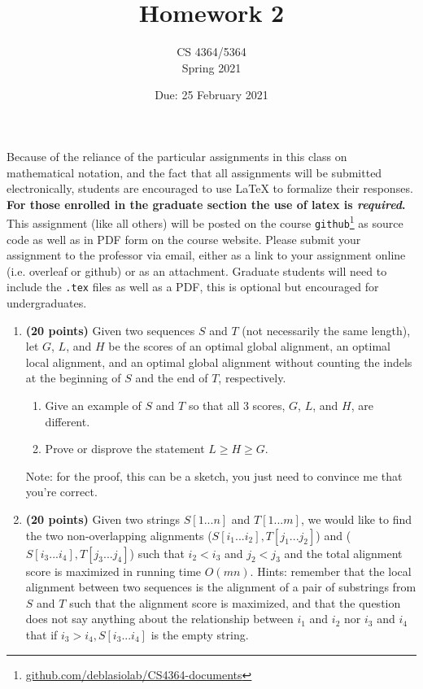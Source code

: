 \documentclass[11pt, oneside]{article}   	%
\title{Homework 2}
\author{CS 4364/5364\\Spring 2021}
\date{Due: 25 February 2021}							%
\begin{document}
\maketitle

Because of the reliance of the particular assignments in this class on mathematical notation, 
and the fact that all assignments will be submitted electronically, 
students are encouraged to use \LaTeX{} to formalize their responses. 
\textbf{For those enrolled in the graduate section the use of latex is \emph{required}.}
This assignment (like all others) will be posted on the course \texttt{github}\footnote{\url{github.com/deblasiolab/CS4364-documents}} as source code as well as in PDF form on the course website. 
Please submit your assignment to the professor via email, either as a link to your assignment online (i.e. overleaf or github) or as an attachment. 
Graduate students will need to include the \texttt{.tex} files as well as a PDF, this is optional but encouraged for undergraduates. 


\begin{enumerate}


\item \textbf{(20 points)} 
Given two sequences $S$ and $T$ (not necessarily the same length), 
let $G$, $L$, and $H$ be the scores of an optimal global alignment, an optimal local alignment, 
and an optimal global alignment without counting the indels at the beginning of $S$ and the end of $T$, respectively. 
\begin{enumerate}
\item Give an example of $S$ and $T$ so that all 3 scores, $G$, $L$, and $H$, are different. 
\item Prove or disprove the statement $L \ge H \ge G$.
\end{enumerate}

Note: for the proof, this can be a sketch, you just need to convince me that you're correct. 


\item \textbf{(20 points)} 
Given two strings $S[1...n]$ and $T[1...m]$, we would like to find the two non-overlapping alignments 
($S[i_1...i_2],T[j_1...j_2]$) and ($S[i_3...i_4],T[j_3...j_4]$) such that $i_2<i_3$ and $j_2<j_3$ and the total alignment score is maximized 
in running time $O(mn)$. 
Hints: remember that the local alignment between two sequences is the alignment of a pair of substrings from $S$ and $T$ such that the alignment score is maximized, 
and that the question does not say anything about the relationship between $i_1$ and $i_2$ nor $i_3$ and $i_4$ that if $i_3>i_4, S[i_3...i_4]$ is the empty string.
\end{enumerate}
\end{document}
